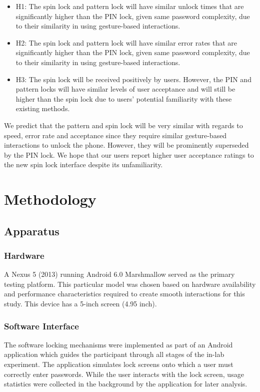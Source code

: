 \documentclass{sigchi}
\begin{document}
\begin{itemize}
	\item H1: The spin lock and pattern lock will have similar unlock times that are significantly higher than the PIN lock, given same password complexity, due to their similarity in using gesture-based interactions.
	\item H2: The spin lock and pattern lock will have similar error rates that are significantly higher than the PIN lock, given same password complexity, due to their similarity in using gesture-based interactions.
   	\item H3: The spin lock will be received positively by users. However, the PIN and pattern locks will have similar levels of user acceptance and will still be higher than the spin lock due to users' potential familiarity with these existing methods.
\end{itemize}

We predict that the pattern and spin lock will be very similar with regards to speed, error rate and acceptance since they require similar gesture-based interactions to unlock the phone. However, they will be prominently superseded by the PIN lock. We hope that our users report higher user acceptance ratings to the new spin lock interface despite its unfamiliarity.

\section{Methodology}
\subsection {Apparatus}
\subsubsection{Hardware}
A Nexus 5 (2013) running Android 6.0 Marshmallow served as the primary testing platform. This particular model was chosen based on hardware availability and performance characteristics required to create smooth interactions for this study. This device has a 5-inch screen (4.95 inch). \\

\subsubsection{Software Interface}
The software locking mechanisms were implemented as part of an Android application which guides the participant through all stages of the in-lab experiment. The application simulates lock screens onto which a user must correctly enter passwords. While the user interacts with the lock screen, usage statistics were collected in the background by the application for later analysis. 
\end{document}
